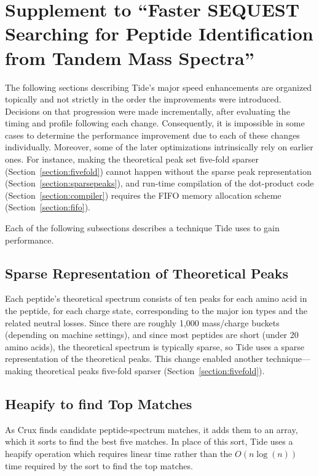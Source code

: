 \chapter{Supplement to ``Faster SEQUEST Searching for Peptide
  Identification from Tandem Mass Spectra''}

The following sections describing Tide's major speed enhancements
are organized topically and not strictly in the order the improvements
were introduced. Decisions on that progression were made
incrementally, after evaluating the timing and profile following each
change. Consequently, it is impossible in some cases to determine
the performance improvement due to each of these changes
individually. Moreover, some of the later optimizations intrinsically
rely on earlier ones. For instance, making the theoretical peak set
five-fold sparser (Section~\ref{section:fivefold}) cannot happen
without the sparse peak representation
(Section~\ref{section:sparsepeaks}), and run-time compilation of the
dot-product code (Section~\ref{section:compiler}) requires the FIFO
memory allocation scheme (Section~\ref{section:fifo}).

Each of the following subsections describes a technique Tide uses to
gain performance.

\section{Sparse Representation of Theoretical Peaks \label{section:sparsepeaks}}

Each peptide's theoretical spectrum consists of ten peaks for each
amino acid in the peptide, for each charge state, corresponding to the
major ion types and the related neutral losses. Since there are
roughly 1,000 mass/charge buckets (depending on machine settings), and
since most peptides are short (under 20 amino acids), the theoretical
spectrum is typically sparse, so Tide uses a sparse representation of
the theoretical peaks. This change enabled another technique---making
theoretical peaks five-fold sparser (Section~\ref{section:fivefold}).

\section{Heapify to find Top Matches}

As Crux finds candidate peptide-spectrum matches, it adds them to an
array, which it sorts to find the best five matches. In place
of this sort, Tide uses a heapify operation which requires linear time
rather than the $O(n \log(n))$ time required by the sort to find the top
matches.

